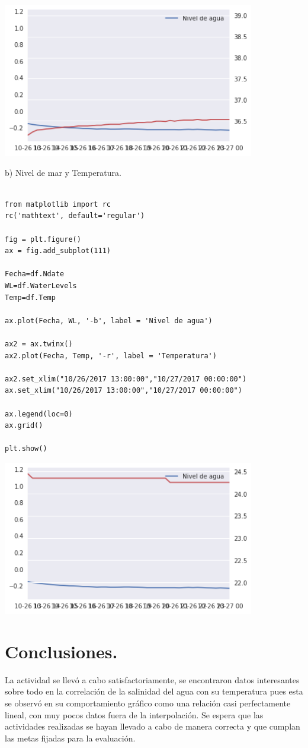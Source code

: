 \documentclass{article} %
\begin{document}
\begin{center}
 	\includegraphics[width=11cm]{5dias1.png}
\end{center}


b) Nivel de mar y Temperatura.

\begin{verbatim} 

from matplotlib import rc
rc('mathtext', default='regular')

fig = plt.figure()
ax = fig.add_subplot(111)

Fecha=df.Ndate
WL=df.WaterLevels
Temp=df.Temp

ax.plot(Fecha, WL, '-b', label = 'Nivel de agua')

ax2 = ax.twinx()
ax2.plot(Fecha, Temp, '-r', label = 'Temperatura')

ax2.set_xlim("10/26/2017 13:00:00","10/27/2017 00:00:00")
ax.set_xlim("10/26/2017 13:00:00","10/27/2017 00:00:00")

ax.legend(loc=0)
ax.grid()

plt.show()
\end{verbatim}


\begin{center}
 	\includegraphics[width=11cm]{5dias2.png}
\end{center}

\section{Conclusiones.}

La actividad se llevó a cabo satisfactoriamente, se encontraron datos interesantes sobre todo en la correlación de la salinidad del agua con su temperatura pues esta se observó en su comportamiento gráfico como una relación casi perfectamente lineal, con muy pocos datos fuera de la interpolación. Se espera que las actividades realizadas se hayan llevado a cabo de manera correcta y que cumplan las metas fijadas para la evaluación. 
\end{document}

